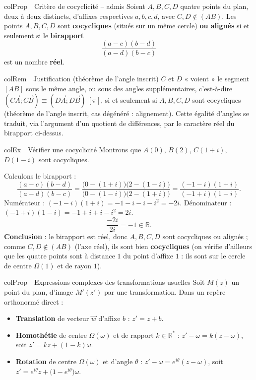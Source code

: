 \documentclass[11pt,a4paper]{article}
\newenvironment{propriete}[1][Propriété]
  {\begin{fiche}{colProp}{\ding{72}~~#1}}{\end{fiche}}
\newenvironment{exemple}[1][Exemple]
  {\begin{fiche}{colEx}{\ding{217}~~#1}}{\end{fiche}}
\newenvironment{remarque}[1][Remarque]
  {\begin{fiche}{colRem}{\ding{43}~~#1}}{\end{fiche}}
\begin{document}
\begin{propriete}[Critère de cocyclicité -- admis]
Soient $A,B,C,D$ quatre points du plan, deux à deux distincts, d'affixes respectives $a,b,c,d$, avec $C,D\notin(AB)$. Les points $A,B,C,D$ sont \textbf{cocycliques} (situés sur un même cercle) \textbf{ou alignés} si et seulement si le \textbf{birapport}
\[
  \frac{(a-c)(b-d)}{(a-d)(b-c)}
\]
est un nombre \textbf{réel}.
\end{propriete}

\begin{remarque}[Justification (théorème de l'angle inscrit)]
$C$ et $D$ « voient » le segment $[AB]$ sous le même angle, ou sous des angles supplémentaires, c'est-à-dire $(\overrightarrow{CA};\overrightarrow{CB}) \equiv (\overrightarrow{DA};\overrightarrow{DB})\ [\pi]$, si et seulement si $A,B,C,D$ sont cocycliques (théorème de l'angle inscrit, cas dégénéré : alignement). Cette égalité d'angles se traduit, via l'argument d'un quotient de différences, par le caractère réel du birapport ci-dessus.
\end{remarque}

\begin{exemple}[Vérifier une cocyclicité]
Montrons que $A(0)$, $B(2)$, $C(1+i)$, $D(1-i)$ sont cocycliques.

\smallskip
Calculons le birapport :
\[
  \frac{(a-c)(b-d)}{(a-d)(b-c)} = \frac{\bigl(0-(1+i)\bigr)\bigl(2-(1-i)\bigr)}{\bigl(0-(1-i)\bigr)\bigl(2-(1+i)\bigr)} = \frac{(-1-i)(1+i)}{(-1+i)(1-i)}.
\]
Numérateur : $(-1-i)(1+i)=-1-i-i-i^2=-2i$. Dénominateur : $(-1+i)(1-i)=-1+i+i-i^2=2i$.
\[
  \frac{-2i}{2i} = -1 \in \mathbb{R}.
\]
\textbf{Conclusion} : le birapport est réel, donc $A,B,C,D$ sont cocycliques ou alignés ; comme $C,D\notin(AB)$ (l'axe réel), ils sont bien \textbf{cocycliques} (on vérifie d'ailleurs que les quatre points sont à distance $1$ du point d'affixe $1$ : ils sont sur le cercle de centre $\Omega(1)$ et de rayon $1$).
\end{exemple}

\begin{propriete}[Expressions complexes des transformations usuelles]
Soit $M(z)$ un point du plan, d'image $M'(z')$ par une transformation. Dans un repère orthonormé direct :
\begin{itemize}[leftmargin=6mm, itemsep=0.5mm]
  \item \textbf{Translation} de vecteur $\vec w$ d'affixe $b$ : \quad $z'=z+b$.
  \item \textbf{Homothétie} de centre $\Omega(\omega)$ et de rapport $k\in\mathbb{R}^*$ : \quad $z'-\omega=k(z-\omega)$, soit $z'=kz+(1-k)\omega$.
  \item \textbf{Rotation} de centre $\Omega(\omega)$ et d'angle $\theta$ : \quad $z'-\omega=e^{i\theta}(z-\omega)$, soit $z'=e^{i\theta}z+\bigl(1-e^{i\theta}\bigr)\omega$.
\end{itemize}
\end{propriete}
\end{document}
